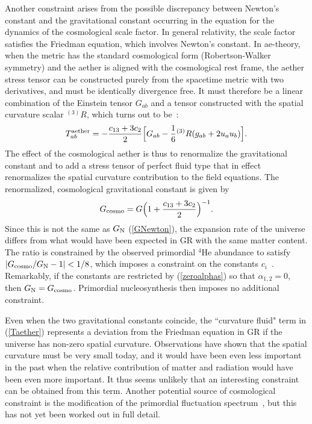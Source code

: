 \documentclass[aps,prd,preprint,amsmath,amssymb]{revtex4}
\def\beq{\begin{equation}}
\def\eeq{\end{equation}}
\def\a{\alpha}
\begin{document}
Another constraint arises from the possible
discrepancy between Newton's constant and the
gravitational constant occurring in the
equation for the dynamics of the cosmological scale factor.
In general relativity, the scale factor satisfies the
Friedman equation, which involves Newton's constant.
In ae-theory, when the metric has the standard cosmological
form (Robertson-Walker symmetry) and the aether
is  aligned with the cosmological rest frame,
the aether stress tensor can be constructed purely from the
spacetime metric with two derivatives,
and must be identically divergence free.
It must therefore be a linear combination of the Einstein
tensor $G_{ab}$ and a tensor constructed with the
spatial curvature scalar ${}^{(3)}R$, which turns out to be~\cite{MJindy,CLim}:
%
\beq\label{Taether}
    T^{\rm aether}_{ab}= -\frac{c_{13}+3c_2}{2}
        \Bigl[G_{ab}-\frac16{}^{(3)}R(g_{ab}+2u_au_b)\Bigr].
\eeq
%
The effect of the cosmological aether is thus to renormalize
the gravitational constant and to add a stress tensor of
perfect fluid type that in effect
renormalizes the spatial curvature contribution to the field
equations. The renormalized, cosmological gravitational constant
is given by~\cite{CLim}
%
\beq
    G_{\rm cosmo}=G\Big(1+\frac{c_{13}+3c_2}{2}\Big)^{-1}.
\eeq
%
Since this is not the same as $G_{\rm N}$ (\ref{GNewton}),
the expansion rate of
the universe differs from what would have been expected in GR with
the same matter content. The ratio is constrained by the observed
primordial ${}^4$He abundance to satisfy $|G_{\rm cosmo}/G_{\rm N}
- 1|<1/8$, which imposes a constraint on the constants
$c_i$~\cite{CLim}. Remarkably, if the constants are restricted by
(\ref{zeroalphas}) so that $\a_{1,2}=0$, then $G_{\rm N}=G_{\rm
cosmo}$. Primordial nucleosynthesis then imposes no additional
constraint.

Even when the two gravitational constants coincide, the
``curvature fluid" term in (\ref{Taether}) represents a deviation
from the Friedman equation in GR if the universe has non-zero
spatial curvature. Observations have shown that the spatial
curvature must be very small today, and it would have been even
less important in the past when the relative contribution of
matter and radiation would have been even more important. It thus
seems unlikely that an interesting constraint can be obtained from
this term. Another potential source of cosmological constraint is
the modification of the primordial fluctuation
spectrum~\cite{Lim}, but this has not yet been worked out in full
detail.
\end{document}
